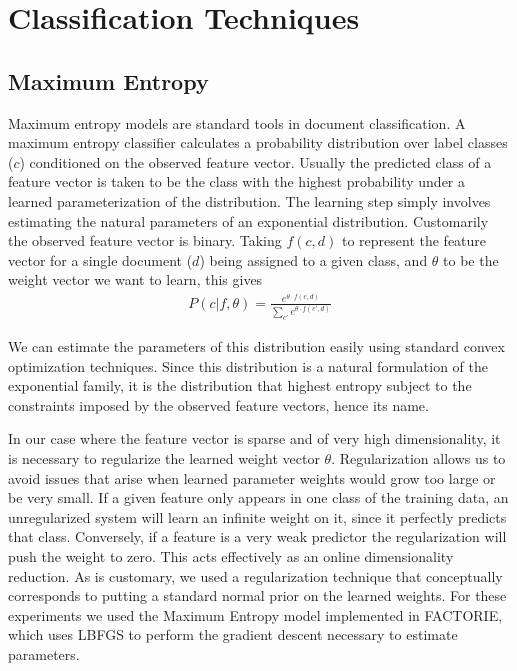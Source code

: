 \section{Classification Techniques}

\subsection{Maximum Entropy} %
\label{sub:maximum_entropy}

\indent
Maximum entropy models are standard tools in document classification\cite{Nigam99usingmaximum}. A maximum entropy classifier calculates a probability distribution over label classes ($c$) conditioned on the observed feature vector. Usually the predicted class of a feature vector is taken to be the class with the highest probability under a learned parameterization of the distribution. The learning step simply involves estimating the natural parameters of an exponential distribution. Customarily the observed feature vector is binary. Taking $f(c,d)$ to represent the feature vector for a single document ($d$) being assigned to a given class, and $\theta$ to be the weight vector we want to learn, this gives
\begin{align*}
	P(c|f, \theta) = \frac{e^{\theta \cdot f(c, d)}}{\sum_{c'} e^{\theta \cdot f(c',d)}}
\end{align*}

We can estimate the parameters of this distribution easily using standard convex optimization techniques. Since this distribution is a natural formulation of the exponential family, it is the distribution that highest entropy subject to the constraints imposed by the observed feature vectors, hence its name. 

In our case where the feature vector is sparse and of very high dimensionality, it is necessary to regularize the learned weight vector $\theta$. Regularization allows us to avoid issues that arise when learned parameter weights would grow too large or be very small. If a given feature only appears in one class of the training data, an unregularized system will learn an infinite weight on it, since it perfectly predicts that class. Conversely, if a feature is a very weak predictor the regularization will push the weight to zero. This acts effectively as an online dimensionality reduction. As is customary, we used a regularization technique that conceptually corresponds to putting a standard normal prior on the learned weights. For these experiments we used the Maximum Entropy model implemented in FACTORIE, which uses LBFGS\cite{Liu89onthe} to perform the gradient descent necessary to estimate parameters.

